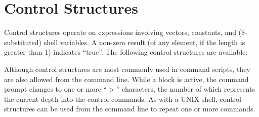 \section{Control Structures}


Control structures operate on expressions involving vectors,
constants, and ({\vt \$}-substituted) shell variables.  A non-zero
result (of any element, if the length is greater than 1) indicates
``true''.  The following control structures are available:

Although control structures are most commonly used in command scripts,
they are also allowed from the command line.  While a block is active,
the command prompt changes to one or more ``$>$'' characters, the
number of which represents the current depth into the control
commands.  As with a UNIX shell, control structures can be used from
the command line to repeat one or more commands.


